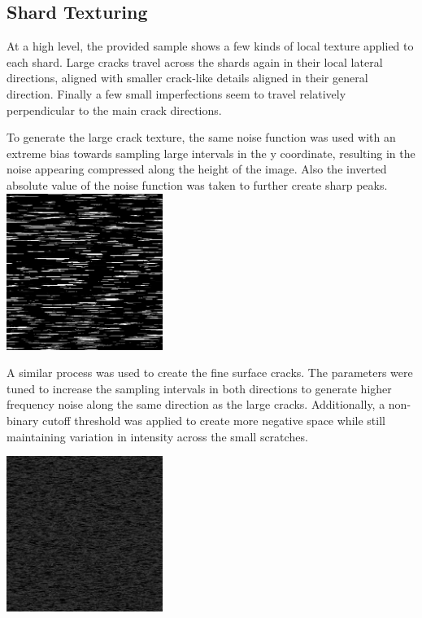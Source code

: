 \documentclass[a4paper, 11pt, titlepage]{article}
\begin{document}
\subsection{Shard Texturing}
At a high level, the provided sample shows a few kinds of local texture applied to each
shard. Large cracks travel across the shards again in their local lateral
directions, aligned with smaller crack-like details aligned in their general
direction. Finally a few small imperfections seem to travel relatively
perpendicular to the main crack directions. 

To generate the large crack texture, the same noise function was used with an extreme
bias towards sampling large intervals in the y coordinate, resulting in the
noise appearing compressed along the height of the image. Also the inverted absolute
value of the noise function was taken to further create sharp peaks. \\

 {
    \includegraphics[width=2.0in]{images/large-crack-texture.png}
}

A similar process was used to create the fine surface cracks. The parameters
were tuned to increase the sampling intervals in both directions to generate
higher frequency noise along the same direction as the large cracks.
Additionally, a non-binary cutoff threshold was applied to create more negative
space while still maintaining variation in intensity across the small scratches.

 {
    \includegraphics[width=2.0in]{images/small-crack-texture.png}
}
\end{document}
